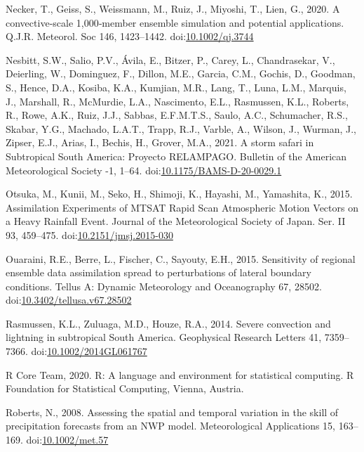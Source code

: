 \documentclass[final,5p,times,twocolumn,authoryear]{elsarticle} %
\begin{document}
\leavevmode\hypertarget{ref-necker2020}{}%
Necker, T., Geiss, S., Weissmann, M., Ruiz, J., Miyoshi, T., Lien, G., 2020. A convective‐scale 1,000‐member ensemble simulation and potential applications. Q.J.R. Meteorol. Soc 146, 1423--1442. doi:\href{https://doi.org/10.1002/qj.3744}{10.1002/qj.3744}

\leavevmode\hypertarget{ref-nesbitt2021}{}%
Nesbitt, S.W., Salio, P.V., Ávila, E., Bitzer, P., Carey, L., Chandrasekar, V., Deierling, W., Dominguez, F., Dillon, M.E., Garcia, C.M., Gochis, D., Goodman, S., Hence, D.A., Kosiba, K.A., Kumjian, M.R., Lang, T., Luna, L.M., Marquis, J., Marshall, R., McMurdie, L.A., Nascimento, E.L., Rasmussen, K.L., Roberts, R., Rowe, A.K., Ruiz, J.J., Sabbas, E.F.M.T.S., Saulo, A.C., Schumacher, R.S., Skabar, Y.G., Machado, L.A.T., Trapp, R.J., Varble, A., Wilson, J., Wurman, J., Zipser, E.J., Arias, I., Bechis, H., Grover, M.A., 2021. A storm safari in Subtropical South America: Proyecto RELAMPAGO. Bulletin of the American Meteorological Society -1, 1--64. doi:\href{https://doi.org/10.1175/BAMS-D-20-0029.1}{10.1175/BAMS-D-20-0029.1}

\leavevmode\hypertarget{ref-otsuka2015}{}%
Otsuka, M., Kunii, M., Seko, H., Shimoji, K., Hayashi, M., Yamashita, K., 2015. Assimilation Experiments of MTSAT Rapid Scan Atmospheric Motion Vectors on a Heavy Rainfall Event. Journal of the Meteorological Society of Japan. Ser. II 93, 459--475. doi:\href{https://doi.org/10.2151/jmsj.2015-030}{10.2151/jmsj.2015-030}

\leavevmode\hypertarget{ref-ouaraini2015}{}%
Ouaraini, R.E., Berre, L., Fischer, C., Sayouty, E.H., 2015. Sensitivity of regional ensemble data assimilation spread to perturbations of lateral boundary conditions. Tellus A: Dynamic Meteorology and Oceanography 67, 28502. doi:\href{https://doi.org/10.3402/tellusa.v67.28502}{10.3402/tellusa.v67.28502}

\leavevmode\hypertarget{ref-rasmussen2014}{}%
Rasmussen, K.L., Zuluaga, M.D., Houze, R.A., 2014. Severe convection and lightning in subtropical South America. Geophysical Research Letters 41, 7359--7366. doi:\href{https://doi.org/10.1002/2014GL061767}{10.1002/2014GL061767}

\leavevmode\hypertarget{ref-rcoreteam2020}{}%
R Core Team, 2020. R: A language and environment for statistical computing. R Foundation for Statistical Computing, Vienna, Austria.

\leavevmode\hypertarget{ref-roberts2008}{}%
Roberts, N., 2008. Assessing the spatial and temporal variation in the skill of precipitation forecasts from an NWP model. Meteorological Applications 15, 163--169. doi:\href{https://doi.org/10.1002/met.57}{10.1002/met.57}
\end{document}
